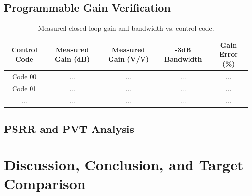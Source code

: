 \documentclass[12pt, a4paper]{article}
\begin{document}
\subsection{Programmable Gain Verification}
\begin{table}[H]
    \centering
    \begin{tabular}{@{} c c c c c @{}}
        \toprule
        \textbf{Control Code} & \textbf{Measured Gain (dB)} & \textbf{Measured Gain (V/V)} & \textbf{-3dB Bandwidth} & \textbf{Gain Error (\%)} \\
        \midrule
        Code 00 & ... & ... & ... & ... \\
        Code 01 & ... & ... & ... & ... \\
        ... & ... & ... & ... & ... \\
        \bottomrule
    \end{tabular}
    \caption{Measured closed-loop gain and bandwidth vs. control code.}
\end{table}

\subsection{PSRR and PVT Analysis}

\section{Discussion, Conclusion, and Target Comparison}
\end{document}
